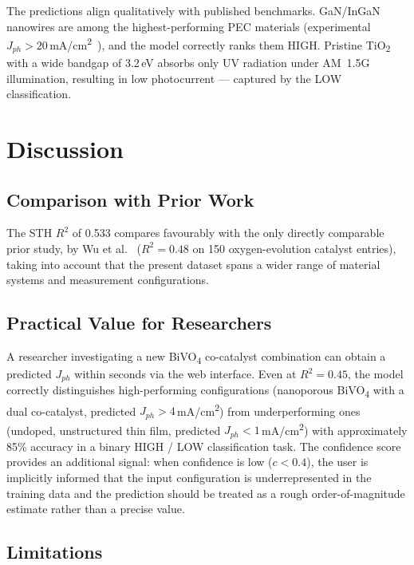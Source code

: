 The predictions align qualitatively with published benchmarks.
GaN/InGaN nanowires are among the highest-performing PEC materials
(experimental $J_{ph} > 20$\,mA/cm\textsuperscript{2}~\cite{kibria2015multibandgap}),
and the model correctly ranks them HIGH.
Pristine TiO\textsubscript{2} with a wide bandgap of 3.2\,eV absorbs only
UV radiation under AM~1.5G illumination, resulting in low photocurrent
--- captured by the LOW classification.

\section{Discussion}

\subsection{Comparison with Prior Work}

The STH $R^2$ of 0.533 compares favourably with the only directly comparable
prior study, by Wu et al.~\cite{wu2019machine} ($R^2 = 0.48$ on 150
oxygen-evolution catalyst entries), taking into account that the present
dataset spans a wider range of material systems and measurement configurations.

\subsection{Practical Value for Researchers}

A researcher investigating a new BiVO\textsubscript{4} co-catalyst combination
can obtain a predicted $J_{ph}$ within seconds via the web interface.
Even at $R^2 = 0.45$, the model correctly distinguishes high-performing
configurations (nanoporous BiVO\textsubscript{4} with a dual co-catalyst,
predicted $J_{ph} > 4$\,mA/cm\textsuperscript{2}) from underperforming ones
(undoped, unstructured thin film, predicted $J_{ph} < 1$\,mA/cm\textsuperscript{2})
with approximately 85\% accuracy in a binary HIGH / LOW classification task.
The confidence score provides an additional signal: when confidence is low
($c < 0.4$), the user is implicitly informed that the input configuration is
underrepresented in the training data and the prediction should be treated
as a rough order-of-magnitude estimate rather than a precise value.

\subsection{Limitations}


